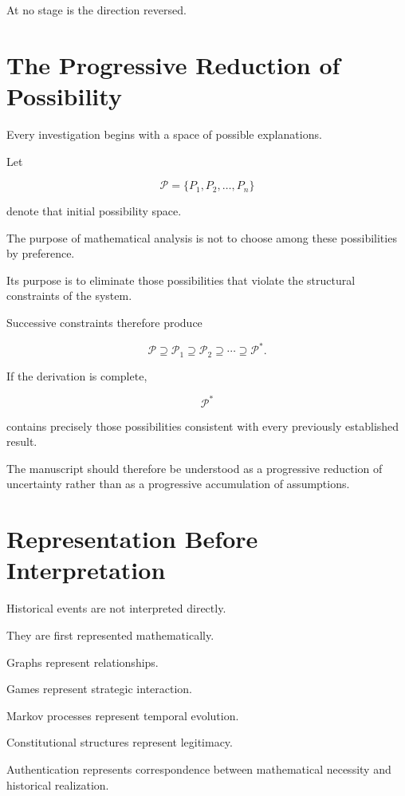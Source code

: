 \documentclass[11pt,openany]{book}
\theoremstyle{plain}
\theoremstyle{definition}
\begin{document}
At no stage is the direction reversed.


\section*{The Progressive Reduction of Possibility}

Every investigation begins with a space of possible explanations.

Let

\[
\mathcal{P}
=
\{P_1,P_2,\ldots,P_n\}
\]

denote that initial possibility space.

The purpose of mathematical analysis is not to choose among these possibilities by preference.

Its purpose is to eliminate those possibilities that violate the structural constraints of the system.

Successive constraints therefore produce

\[
\mathcal{P}
\supseteq
\mathcal{P}_1
\supseteq
\mathcal{P}_2
\supseteq
\cdots
\supseteq
\mathcal{P}^{*}.
\]

If the derivation is complete,

\[
\boxed{
\mathcal{P}^{*}
}
\]

contains precisely those possibilities consistent with every previously established result.

The manuscript should therefore be understood as a progressive reduction of uncertainty rather than as a progressive accumulation of assumptions.


\section*{Representation Before Interpretation}

Historical events are not interpreted directly.

They are first represented mathematically.

Graphs represent relationships.

Games represent strategic interaction.

Markov processes represent temporal evolution.

Constitutional structures represent legitimacy.

Authentication represents correspondence between mathematical necessity and historical realization.
\end{document}
